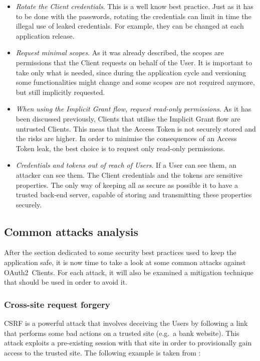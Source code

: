 \documentclass[a4paper,12pt]{article}
\def\eg{e.g.\xspace}
\def\oauth{OAuth2\xspace}
\begin{document}
\begin{itemize}
    \item \textit{Rotate the Client credentials}. \label{rotate} This is a well know best practice. Just as it has to be done with the passwords, rotating the credentials can limit in time the illegal use of leaked credentials. For example, they can be changed at each application release.
    \item \textit{Request minimal scopes}. As it was already described, the scopes are permissions that the Client requests on behalf of the User. It is important to take only what is needed, since during the application cycle and versioning some functionalities might change and some scopes are not required anymore, but still implicitly requested.
    \item \textit{When using the Implicit Grant flow, request read-only permissions}. As it has been discussed previously, Clients that utilise the Implicit Grant flow are untrusted Clients. This meas that the Access Token is not securely stored and the risks are higher. In order to minimise the consequences of an Access Token leak, the best choice is to request only read-only permissions.
    \item \textit{Credentials and tokens out of reach of Users}. If a User can see them, an attacker can see them. The Client credentials and the tokens are sensitive properties. The only way of keeping all as secure as possible it to have a trusted back-end server, capable of storing and transmitting these properties securely.
\end{itemize}

\subsection{Common attacks analysis}
After the section dedicated to some security best practices used to keep the application safe, it is now time to take a look at some common attacks against \oauth\ Clients. For each attack, it will also be examined a mitigation technique that should be used in order to avoid it.

\subsubsection{Cross-site request forgery}
\label{csrf}
CSRF is a powerful attack that involves deceiving the Users by following a link that performs some bad actions on a trusted site (\eg\ a bank website). This attack exploits a pre-existing session with that site in order to provisionally gain access to the trusted site. The following example is taken from \cite{mastering}:
\end{document}
